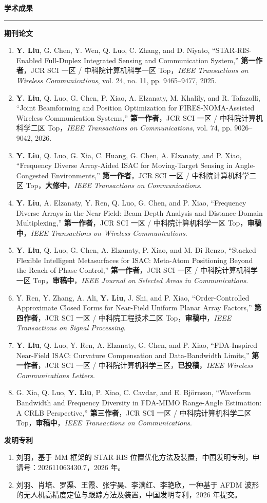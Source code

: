 \documentclass[10.5pt,a4paper,fontset=fandol]{ctexart}
\newcommand{\ressection}[1]{%
  \needspace{3\baselineskip}\vspace{.55em}%
  {\zihao{4}\bfseries #1}\par\vspace{-.45em}%
  \noindent\rule{\textwidth}{0.45pt}\vspace{.30em}}
\begin{document}
\ressection{学术成果}
\textbf{期刊论文}
\begin{enumerate}[leftmargin=1.65em,itemsep=.12em,parsep=0pt]
\item \textbf{Y. Liu}, G. Chen, Y. Wen, Q. Luo, C. Zhang, and D. Niyato, ``STAR-RIS-Enabled Full-Duplex Integrated Sensing and Communication System,'' \textbf{第一作者}，JCR SCI 一区 / 中科院计算机科学一区 Top，\textit{IEEE Transactions on Wireless Communications}, vol. 24, no. 11, pp. 9465--9477, 2025.
\item \textbf{Y. Liu}, Q. Luo, G. Chen, P. Xiao, A. Elzanaty, M. Khalily, and R. Tafazolli, ``Joint Beamforming and Position Optimization for FIRES-NOMA-Assisted Wireless Communication Systems,'' \textbf{第一作者}，JCR SCI 一区 / 中科院计算机科学二区 Top，\textit{IEEE Transactions on Communications}, vol. 74, pp. 9026--9042, 2026.
\item \textbf{Y. Liu}, Q. Luo, G. Xia, C. Huang, G. Chen, A. Elzanaty, and P. Xiao, ``Frequency Diverse Array-Aided ISAC for Moving-Target Sensing in Angle-Congested Environments,'' \textbf{第一作者}，JCR SCI 一区 / 中科院计算机科学二区 Top，\textbf{大修中}，\textit{IEEE Transactions on Communications}.
\item \textbf{Y. Liu}, A. Elzanaty, Y. Ren, Q. Luo, G. Chen, and P. Xiao, ``Frequency Diverse Arrays in the Near Field: Beam Depth Analysis and Distance-Domain Multiplexing,'' \textbf{第一作者}，JCR SCI 一区 / 中科院计算机科学一区 Top，\textbf{审稿中}，\textit{IEEE Transactions on Wireless Communications}.
\item \textbf{Y. Liu}, Q. Luo, G. Chen, A. Elzanaty, P. Xiao, and M. Di Renzo, ``Stacked Flexible Intelligent Metasurfaces for ISAC: Meta-Atom Positioning Beyond the Reach of Phase Control,'' \textbf{第一作者}，JCR SCI 一区 / 中科院计算机科学一区 Top，\textbf{审稿中}，\textit{IEEE Journal on Selected Areas in Communications}.
\item Y. Ren, Y. Zhang, A. Ali, \textbf{Y. Liu}, J. Shi, and P. Xiao, ``Order-Controlled Approximate Closed Forms for Near-Field Uniform Planar Array Factors,'' \textbf{第四作者}，JCR SCI 一区 / 中科院工程技术二区 Top，\textbf{审稿中}，\textit{IEEE Transactions on Signal Processing}.
\item \textbf{Y. Liu}, Q. Luo, Y. Ren, A. Elzanaty, G. Chen, and P. Xiao, ``FDA-Inspired Near-Field ISAC: Curvature Compensation and Data-Bandwidth Limits,'' \textbf{第一作者}，JCR SCI 一区 / 中科院计算机科学三区，\textbf{已投稿}，\textit{IEEE Wireless Communications Letters}.
\item G. Xia, Q. Luo, \textbf{Y. Liu}, P. Xiao, C. Cavdar, and E. Björnson, ``Waveform Bandwidth and Frequency Diversity in FDA-MIMO Range-Angle Estimation: A CRLB Perspective,'' \textbf{第三作者}，JCR SCI 一区 / 中科院计算机科学二区 Top，\textbf{审稿中}，\textit{IEEE Transactions on Communications}.
\end{enumerate}

\textbf{发明专利}
\begin{enumerate}[leftmargin=1.65em,itemsep=.12em,parsep=0pt]
\item 刘羽，基于 MM 框架的 STAR-RIS 位置优化方法及装置，中国发明专利，申请号：202611063430.7，2026 年。
\item 刘羽、肖培、罗渠、王霞、张宇昊、李满红、李艳欣，一种基于 AFDM 波形的无人机高精度定位与跟踪方法及装置，中国发明专利，2026 年提交。
\end{enumerate}
\end{document}
